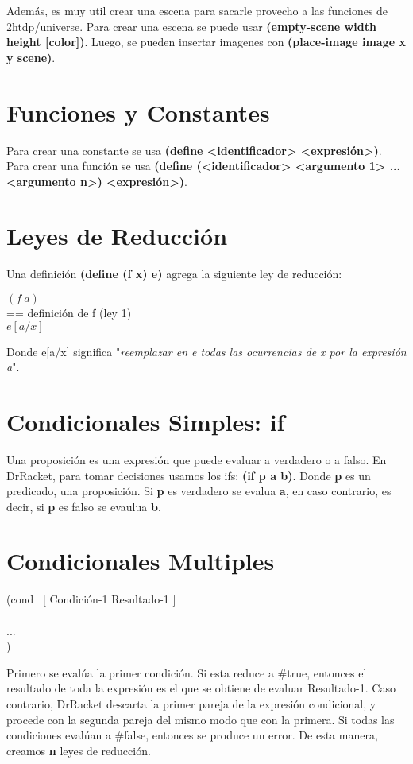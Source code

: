 \documentclass[11pt,a4paper]{article}
\begin{document}
Adem\'as, es muy util crear una escena para sacarle provecho a las funciones de 2htdp/universe. Para crear una escena se puede usar \textbf{(empty-scene width height [color])}. Luego, se pueden insertar imagenes con \textbf{(place-image image x y scene)}.

\section{Funciones y Constantes}
Para crear una constante se usa \textbf{(define <identificador> <expresión>)}. Para crear una funci\'on se usa \textbf{(define (<identificador> <argumento 1> ... <argumento n>) <expresión>)}.

\section{Leyes de Reducci\'on}
Una definici\'on \textbf{(define (f x) e)} agrega la siguiente ley de reducci\'on:
\begin{siderules}
$(f\ a)$\\
== definición de f (ley 1)\\
$e[a/x]$
\end{siderules}
Donde e[a/x] significa "\textit{reemplazar en e todas las ocurrencias de x por la expresión a}".

\section{Condicionales Simples: if}
Una proposición es una expresión que puede evaluar a verdadero o a falso. En DrRacket, para tomar decisiones usamos los ifs: \textbf{(if p a b)}. Donde \textbf{p} es un predicado, una proposición. Si \textbf{p} es verdadero se evalua \textbf{a}, en caso contrario, es decir, si \textbf{p} es falso se evaulua \textbf{b}.

\section{Condicionales Multiples}
\begin{siderules}
\noindent (cond  \ [ Condición-1 Resultado-1 ]\\
\indent {}\\
\indent \indent ...\\
\indent {})
\end{siderules}

Primero se evalúa la primer condición. Si esta reduce a \#true, entonces el resultado de toda la expresión es el que se obtiene de evaluar Resultado-1. Caso contrario, DrRacket descarta la primer pareja de la expresión condicional, y procede con la segunda pareja del mismo modo que con la primera. Si todas las condiciones evalúan a \#false, entonces se produce un error. De esta manera, creamos \textbf{n} leyes de reducci\'on.
\end{document}
